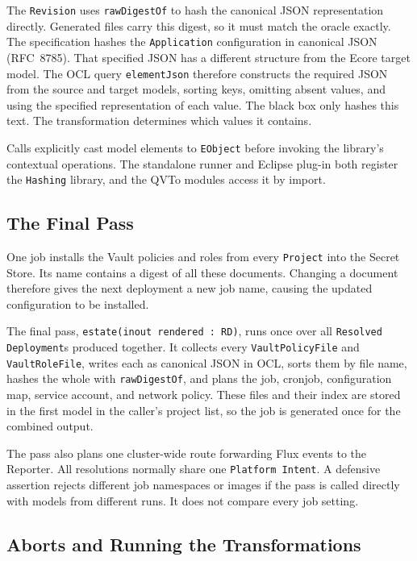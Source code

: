 The \texttt{Revision} uses \texttt{rawDigestOf} to hash the canonical JSON representation directly. Generated files carry this
digest, so it must match the oracle exactly. The specification hashes the
\texttt{Application} configuration in canonical JSON (RFC~8785). That
specified JSON has a different structure from the Ecore target model. The OCL query
\texttt{elementJson} therefore constructs the required JSON from the source
and target models, sorting keys, omitting absent values, and using the
specified representation of each value. The black box only hashes this
text. The transformation determines which values it contains.

Calls explicitly cast model elements to \texttt{EObject} before invoking
the library's contextual operations. The standalone runner and Eclipse plug-in both register the \texttt{Hashing}
library, and the QVTo modules access it by import.

\subsection{The Final Pass}
\label{sec:finalpass}

One job installs the Vault policies and roles from every \texttt{Project}
into the Secret Store. Its name contains a digest of all these documents.
Changing a document therefore gives the next deployment a new job name,
causing the updated configuration to be installed.

The final pass, \texttt{estate(inout rendered : RD)}, runs once over all
\texttt{Resolved Deployment}s produced together. It collects every
\texttt{VaultPolicyFile} and \texttt{VaultRoleFile}, writes each as
canonical JSON in OCL, sorts them by file name, hashes the whole with
\texttt{rawDigestOf}, and plans the job, cronjob, configuration map, service account,
and network policy. These files and their index are stored in the first
model in the caller's project list, so the job is generated once for the combined output.

The pass also plans one cluster-wide route forwarding Flux events to the
Reporter.
All resolutions normally share one \texttt{Platform Intent}. A defensive
assertion rejects different job namespaces or images if the pass is called
directly with models from different runs. It does not compare every job setting.

\subsection{Aborts and Running the Transformations}
\label{sec:aborts}

